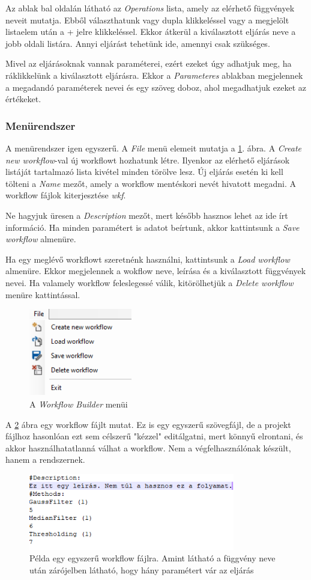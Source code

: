 \documentclass[a4paper,12pt]{article}
\begin{document}
Az ablak bal oldalán látható az \textit{Operations} lista, amely az elérhető függvények neveit mutatja. Ebből választhatunk vagy dupla klikkeléssel vagy a megjelölt listaelem után a + jelre klikkeléssel. Ekkor átkerül a kiválasztott eljárás neve a jobb oldali listára. Annyi eljárást tehetünk ide, amennyi csak szükséges.

Mivel az eljárásoknak vannak paraméterei, ezért ezeket úgy adhatjuk meg, ha ráklikkelünk a kiválasztott eljárásra. Ekkor a \textit{Parameteres} ablakban megjelennek a megadandó paraméterek nevei és egy szöveg doboz, ahol megadhatjuk ezeket az értékeket.

\subsubsection{Menürendszer}

A menürendszer igen egyszerű. A \textit{File} menü elemeit mutatja a \ref{fig:workflowmenu}. ábra. A \textit{Create new workflow}-val új workflowt hozhatunk létre. Ilyenkor az elérhető eljárások listáját tartalmazó lista kivétel minden törölve lesz. Új eljárás esetén ki kell tölteni a \textit{Name} mezőt, amely a workflow mentéskori nevét hivatott megadni. A workflow fájlok kiterjesztése \textit{wkf}.

Ne hagyjuk üresen a \textit{Description} mezőt, mert később hasznos lehet az ide írt információ. Ha minden paramétert is adatot beírtunk, akkor kattintsunk a \textit{Save workflow} almenüre.

Ha egy meglévő workflowt szeretnénk használni, kattintsunk a \textit{Load workflow} almenüre. Ekkor megjelennek a wokflow neve, leírása és a kiválasztott függvények nevei. 
Ha valamely workflow feleslegessé válik, kitörölhetjük a \textit{Delete workflow} menüre kattintással.

	\begin{figure}
	\centering
	\includegraphics[width=4.5cm]{workflow_menu}
	\caption{A \textit{Workflow Builder} menüi}
	\label{fig:workflowmenu}
	\end{figure}

A \ref{fig:workflowfile} ábra egy workflow fájlt mutat. Ez is egy egyszerű szövegfájl, de a projekt fájlhoz hasonlóan ezt sem célszerű "kézzel" editálgatni, mert könnyű elrontani, és akkor használhatatlanná válhat a workflow. Nem a végfelhasználónak készült, hanem a rendszernek.

	\begin{figure}[h]
	\centering
	\includegraphics[width=9cm]{workflowfile}
	\caption{Példa egy egyszerű workflow fájlra. Amint látható a függvény neve után zárójelben látható, hogy hány paramétert vár az eljárás}
	\label{fig:workflowfile}
	\end{figure}
\end{document}
